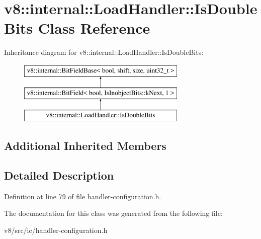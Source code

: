 \hypertarget{classv8_1_1internal_1_1LoadHandler_1_1IsDoubleBits}{}\section{v8\+:\+:internal\+:\+:Load\+Handler\+:\+:Is\+Double\+Bits Class Reference}
\label{classv8_1_1internal_1_1LoadHandler_1_1IsDoubleBits}
Inheritance diagram for v8\+:\+:internal\+:\+:Load\+Handler\+:\+:Is\+Double\+Bits\+:\begin{figure}[H]
\begin{center}
\leavevmode
\includegraphics[height=3.000000cm]{classv8_1_1internal_1_1LoadHandler_1_1IsDoubleBits}
\end{center}
\end{figure}
\subsection*{Additional Inherited Members}


\subsection{Detailed Description}


Definition at line 79 of file handler-\/configuration.\+h.



The documentation for this class was generated from the following file\+:\begin{DoxyCompactItemize}
\item 
v8/src/ic/handler-\/configuration.\+h\end{DoxyCompactItemize}
